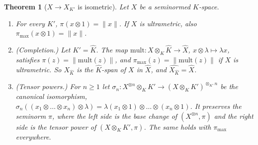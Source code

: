 \documentclass[11pt]{amsart}
\newtheorem{theorem}{Theorem}[section]
\theoremstyle{definition}
\theoremstyle{remark}
\numberwithin{equation}{section}
\newcommand{\norm}[1]{\lVert #1\rVert}
\newcommand{\Kh}{\widehat K}
\theoremstyle{plain}
\theoremstyle{definition}
\theoremstyle{plain}
\begin{document}
\begin{theorem}[$X\to X_{K'}$ is isometric]\label{dp:thm:base-change-isometric}
Let $X$ be a seminormed $K$-space.
\begin{enumerate}
\item For every $K'$, $\pi(x\otimes1)=\norm x$. If $X$ is ultrametric, also $\pi_{\max}(x\otimes1)=\norm x$.
\item \textup{(Completion.)} Let $K'=\Kh$. The map $\mathrm{mult}\colon X\otimes_K\Kh\to\widehat X$, $x\otimes\lambda\mapsto\lambda x$, satisfies $\pi(z)=\norm{\mathrm{mult}(z)}$, and $\pi_{\max}(z)=\norm{\mathrm{mult}(z)}$ if $X$ is ultrametric. So $X_{\Kh}$ is the $\Kh$-span of $X$ in $\widehat X$, and $\widehat{X_{\Kh}}=\widehat X$.
\item \textup{(Tensor powers.)} For $n\ge1$ let $\sigma_n\colon X^{\otimes n}\otimes_KK'\to(X\otimes_KK')^{\otimes_{K'}n}$ be the canonical isomorphism, $\sigma_n((x_1\otimes\dots\otimes x_n)\otimes\lambda)=\lambda(x_1\otimes1)\otimes\dots\otimes(x_n\otimes1)$. It preserves the seminorm $\pi$, where the left side is the base change of $(X^{\otimes n},\pi)$ and the right side is the tensor power of $(X\otimes_KK',\pi)$. The same holds with $\pi_{\max}$ everywhere.
\end{enumerate}
\end{theorem}
\end{document}
